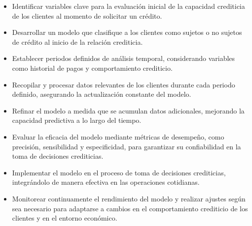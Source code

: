 \begin{itemize}
\item Identificar variables clave para la evaluación inicial de la capacidad crediticia de los clientes al momento de solicitar un crédito.\medskip


\item Desarrollar un modelo que clasifique a los clientes como sujetos o no sujetos de crédito al inicio de la relación crediticia.\medskip

\item Establecer periodos definidos de análisis temporal, considerando variables como historial de pagos y comportamiento crediticio.\medskip

\item Recopilar y procesar datos relevantes de los clientes durante cada periodo definido, asegurando la actualización constante del modelo.\medskip

\item Refinar el modelo  a medida que se acumulan datos adicionales, mejorando la capacidad predictiva a lo largo del tiempo.\medskip

\item Evaluar la eficacia del modelo mediante métricas de desempeño, como precisión, sensibilidad y especificidad, para garantizar su confiabilidad en la toma de decisiones crediticias.\medskip

\item Implementar el modelo en el proceso de toma de decisiones crediticias, integrándolo de manera efectiva en las operaciones cotidianas.\medskip

\item Monitorear continuamente el rendimiento del modelo y realizar ajustes según sea necesario para adaptarse a cambios en el comportamiento crediticio de los clientes y en el entorno económico.\medskip

\end{itemize}